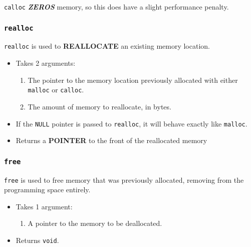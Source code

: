 \texttt{calloc} {\large{\textbf{\emph{ZEROS}}}} memory, so this does have a slight performance penalty.

\subsubsection{\texttt{realloc}}\label{subsubsec:realloc}
\texttt{realloc} is used to \textbf{REALLOCATE} an existing memory location.
\begin{itemize}
\item Takes 2 arguments:
  \begin{enumerate}
  \item The pointer to the memory location previously allocated with either \texttt{malloc} or \texttt{calloc}.
  \item The amount of memory to reallocate, in bytes.
  \end{enumerate}
\item If the \texttt{NULL} pointer is passed to \texttt{realloc}, it will behave exactly like \texttt{malloc}.
\item Returns a \textbf{POINTER} to the front of the reallocated memory
\end{itemize}

\subsubsection{\texttt{free}}\label{subsubsec:free}
\texttt{free} is used to free memory that was previously allocated, removing from the programming space entirely.
\begin{itemize}
\item Takes 1 argument:
  \begin{enumerate}
  \item A pointer to the memory to be deallocated.
  \end{enumerate}
\item Returns \texttt{void}.
\end{itemize}

